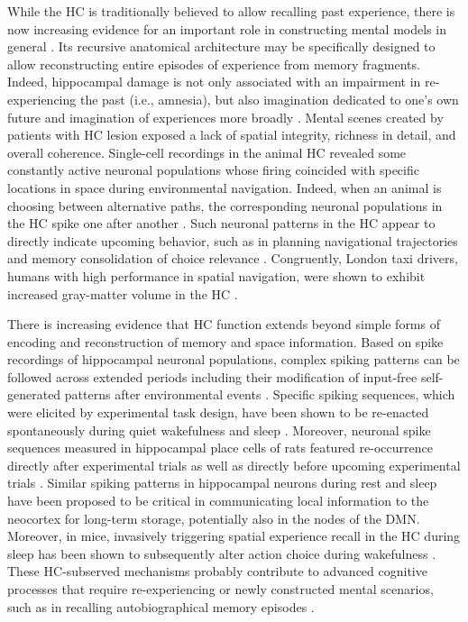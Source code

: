 \documentclass[10pt,letterpaper]{article}
\begin{document}
While the HC
is traditionally believed to allow recalling past experience,
there is now increasing evidence for an important role
in constructing mental models in general
\citep{maguire2016, schacter2007remembering, gelbard2008internally, Javadi2017,
boyer2008evolutionary}.
Its recursive anatomical architecture
may be specifically designed to allow reconstructing
entire episodes of experience from memory fragments.
Indeed,
hippocampal damage is
not only associated with an impairment in re-experiencing the past (i.e., amnesia),
but also imagination dedicated to one's own future and
imagination of experiences more broadly \citep{hassabis2007patients}.
Mental scenes created by patients with HC lesion exposed a lack of
spatial integrity, richness in detail, and overall coherence.
%
Single-cell recordings in the animal HC revealed
some constantly active neuronal populations whose firing coincided with
specific locations in space during environmental navigation.
Indeed, when an animal is choosing between alternative
paths, the corresponding neuronal populations in the HC
spike one after another  \citep{johnson2007neural}.
Such neuronal patterns in the HC appear to directly indicate upcoming behavior,
such as in planning navigational trajectories
\citep{pfeiffer2013hippocampal} and
memory consolidation of choice relevance \citep{lavilleon2015}.
Congruently,
London taxi drivers, humans with high performance in spatial navigation,
were shown to exhibit increased gray-matter volume in the
HC \citep{maguire2000navigation}.


There is increasing evidence that
HC function extends beyond simple forms of
encoding and reconstruction of memory and space information.
Based on spike recordings of hippocampal neuronal populations,
complex spiking patterns can be followed across extended periods including
their modification of input-free self-generated patterns
after environmental events \citep{buzsaki2004large}.
Specific spiking sequences, which were elicited by experimental task design,
have been shown to be re-enacted spontaneously during
quiet wakefulness and sleep \citep{hartley2014space, o2010play}.
Moreover, neuronal spike sequences measured in hippocampal place cells of rats
featured re-occurrence directly after experimental trials
as well as directly before upcoming experimental trials \citep{diba2007forward}.
Similar spiking patterns in hippocampal neurons during rest and sleep
have been proposed to be critical in communicating local information
to the neocortex for long-term storage, potentially also in the nodes of the DMN.
Moreover, in mice, invasively triggering spatial experience recall
in the HC during sleep
has been shown to subsequently alter action choice during wakefulness
\citep{lavilleon2015}.
These HC-subserved mechanisms
probably contribute to advanced cognitive processes that require
re-experiencing or newly constructed mental scenarios,
such as in recalling autobiographical memory episodes
\citep{hassabis2007patients}.
\end{document}
